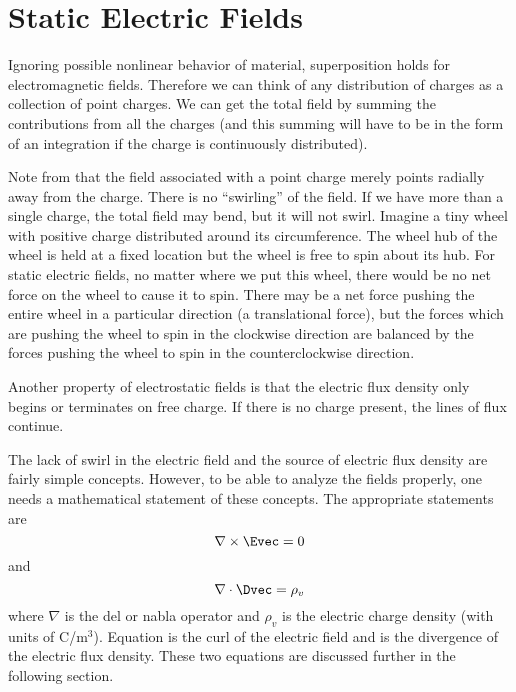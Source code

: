 \section{Static Electric Fields}

Ignoring possible nonlinear behavior of material, superposition holds
for electromagnetic fields.  Therefore we can think of any
distribution of charges as a collection of point charges.  We can get
the total field by summing the contributions from all the charges (and
this summing will have to be in the form of an integration if the
charge is continuously distributed).

Note from  that the field associated with a point
charge merely points radially away from the charge.  There is no
``swirling'' of the field.  If we have more than a single charge, the
total field may bend, but it will not swirl.  Imagine a tiny wheel
with positive charge distributed around its circumference.  The wheel
hub of the wheel is held at a fixed location but the wheel is free to
spin about its hub.  For static electric fields, no matter where we
put this wheel, there would be no net force on the wheel to cause it
to spin.  There may be a net force pushing the entire wheel in a
particular direction (a translational force), but the forces which are
pushing the wheel to spin in the clockwise direction are balanced by
the forces pushing the wheel to spin in the counterclockwise
direction.

Another property of electrostatic fields is that the electric flux
density only begins or terminates on free charge.  If there is no
charge present, the lines of flux continue.

The lack of swirl in the electric field and the source of electric
flux density are fairly simple concepts.  However, to be able to
analyze the fields properly, one needs a mathematical statement of
these concepts.  The appropriate statements are
\begin{equation}
  \nabla\times\Evec=0
  \label{eq:curlE}
\end{equation}
and
\begin{equation}
  \nabla\cdot\Dvec=\rho_v
  \label{eq:divD}
\end{equation}
where $\nabla$ is the del or nabla operator and $\rho_v$ is the
electric charge density (with units of C/m$^3$).  Equation
 is the curl of the electric field and 
is the divergence of the electric flux density.  These two equations
are discussed further in the following section.

